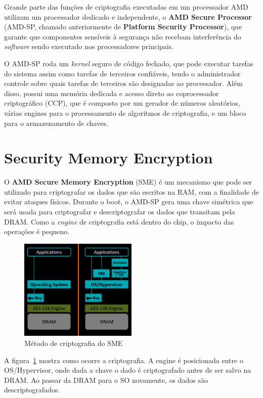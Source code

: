 \documentclass{report}
\begin{document}
Grande parte das funções de criptografia executadas em um processador AMD
utilizam um processador dedicado e independente, o \textbf{AMD Secure
Processor} (AMD-SP, chamado anteriormente de \textbf{Platform Security
Processor}), que garante que componentes sensíveis à segurança não recebam
interferência do \textit{software} sendo executado nos processadores
principais.

O AMD-SP roda um \textit{kernel} seguro de código fechado, que pode executar
tarefas do sistema assim como tarefas de terceiros confiáveis, tendo o
administrador controle sobre quais tarefas de terceiros são designadas ao
processador. Além disso, possui uma memória dedicada e acesso direto ao
coprocessador criptográfico (CCP), que é composto por um gerador de números
aleatórios, várias engines para o processamento de algoritmos de criptografia,
e um bloco para o armazenamento de chaves.

\section{Security Memory Encryption}

O \textbf{AMD Secure Memory Encryption} (SME) é um mecanismo que pode ser
utilizado para criptografar os dados que são escritos na RAM, com a finalidade
de evitar ataques físicos. Durante o boot, o AMD-SP gera uma chave simétrica
que será usada para criptografar e descriptografar os dados que transitam pela
DRAM\@. Como a \textit{engine} de criptografia está dentro do chip, o impacto
das operações é pequeno.

\begin{figure}[h]
    \centering
    \includegraphics[width=0.5\textwidth]{img/sme}
    \caption{Método de criptografia do SME}\label{sme-1}
\end{figure}

A figura~\ref{sme-1} mostra como ocorre a criptografia. A engine é posicionada
entre o OS/Hypervisor, onde dada a chave o dado é criptografado antes de ser
salvo na DRAM\@. Ao passar da DRAM para o SO novamente, os dados são
descriptografados.
\end{document}
